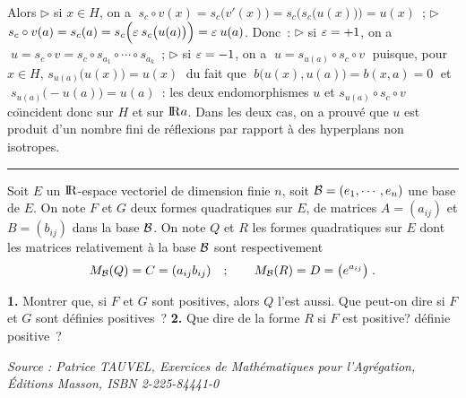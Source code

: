 \documentclass{article}
\begin{document}
Alors\ssk\new
$\triangleright$ si $x\in H$, on a $\;s_c\circ v(x)=s_c\big(v'(x)\big)=s_c\Big(s_c\big(u(x)\big)\Big)=u(x)$~;\ssk\new
$\triangleright$ $s_c\circ v(a)=s_c(a)=s_c\Big(\varepsilon\>s_c\big(u(a)\big)\Big)=\varepsilon\>u(a)$.\ssk\sect\quad
Donc~:\ssk\new
$\triangleright$ si $\varepsilon=+1$, on a $\;u=s_c\circ v=s_c\circ s_{a_1}\circ\cdots\circ s_{a_k}$~;\ssk\new
$\triangleright$ si $\varepsilon=-1$, on a $\;u=s_{u(a)}\circ s_c\circ v\;$ puisque, pour $x\in H$, $s_{u(a)}\big(u(x)\big)=u(x)\;$ du fait que $\;b\big(u(x),u(a)\big)=b(x,a)=0\;$ et $\;s_{u(a)}\big(-u(a)\big)=u(a)$~: les deux endomorphismes $u$ et $s_{u(a)}\circ s_c\circ v$ co\"\i ncident donc sur $H$ et sur ${\rm I\kern-0.6mm R} a$.
\msk\sect
Dans les deux cas, on a prouv\'e que $u$ est produit d'un nombre fini de r\'eflexions par rapport \`a des hyperplans non isotropes. 

  
\bsk
\hrule
\bsk

Soit $E$ un ${\rm I\kern-0.6mm R}$-espace vectoriel de dimension finie $n$, soit ${\cal B}=(e_1,\cdots,e_n)$ une base de $E$. On note $F$ et $G$ deux formes quadratiques sur $E$, de matrices $A=(a_{ij})$ et $B=(b_{ij})$ dans la base ${\cal B}$.\ssk
On note $Q$ et $R$ les formes quadratiques sur $E$ dont les matrices relativement \`a la base ${\cal B}$ sont respectivement\vv
$$M_{{\cal B}}(Q)=C=(a_{ij}b_{ij})\quad;\qquad M_{{\cal B}}(R)=D=\big(e^{a_{ij}}\big)\;.$$
\par
{\bf 1.} Montrer que, si $F$ et $G$ sont positives, alors $Q$ l'est aussi. Que peut-on dire si $F$ et $G$ sont d\'efinies positives~?\ssk
{\bf 2.} Que dire de la forme $R$ si $F$ est positive? d\'efinie positive~?

\msk
{\it Source : Patrice TAUVEL, Exercices de Math\'ematiques pour l'Agr\'egation, \'Editions Masson, ISBN 2-225-84441-0}

\msk
\cl{- - - - - - - - - - - - - - - - - - - - - - - - - - - - - -}
\msk
\end{document}

